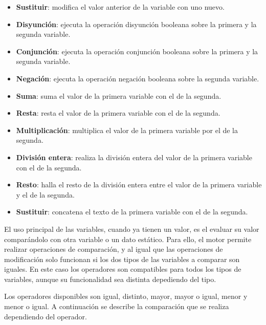 \begin{itemize}
	\item \textbf{Sustituir}: modifica el valor anterior de la variable con uno nuevo.
	\item \textbf{Disyunción}: ejecuta la operación disyunción booleana sobre la primera y la segunda variable.
	\item \textbf{Conjunción}: ejecuta la operación conjunción booleana sobre la primera y la segunda variable.
	\item \textbf{Negación}: ejecuta la operación negación booleana sobre la segunda variable.
	\item \textbf{Suma}: suma el valor de la primera variable con el de la segunda.
	\item \textbf{Resta}: resta el valor de la primera variable con el de la segunda.
	\item \textbf{Multiplicación}: multiplica el valor de la primera variable por el de la segunda.
	\item \textbf{División entera}: realiza la división entera del valor de la primera variable con el de la segunda.
	\item \textbf{Resto}: halla el resto de la división entera entre el valor de la primera variable y el de la segunda.
	\item \textbf{Sustituir}: concatena el texto de la primera variable con el de la segunda.
\end{itemize}

El uso principal de las variables, cuando ya tienen un valor, es el evaluar su valor comparándolo con otra variable o un dato estático. Para ello, el motor permite realizar operaciones de comparación, y al igual que las operaciones de modificación solo funcionan si los dos tipos de las variables a comparar son iguales. En este caso los operadores son compatibles para todos los tipos de variables, aunque su funcionalidad sea distinta depediendo del tipo.

Los operadores disponibles son igual, distinto, mayor, mayor o igual, menor y menor o igual. A continuación se describe la comparación que se realiza dependiendo del operador.

